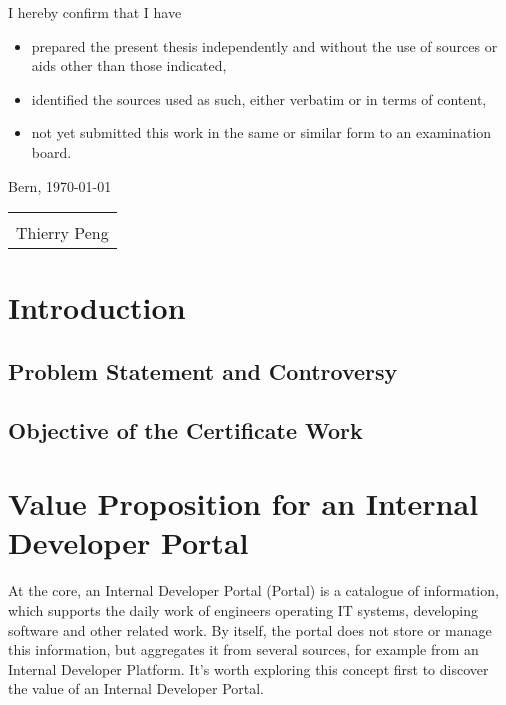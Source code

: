 \documentclass[a4paper,12pt]{article}
\begin{document}
    I hereby confirm that I have
    \begin{itemize}
        \item prepared the present thesis independently and without the use of sources or aids other than those indicated,
        \item identified the sources used as such, either verbatim or in terms of content,
        \item not yet submitted this work in the same or similar form to an examination board.
    \end{itemize}
    Bern, \today\newline
    \newline
    \newline
    \newline
    \begin{tabular}{@{}p{5.0cm}@{}}
        \hrulefill \\
        Thierry Peng
    \end{tabular}

    \pagebreak


    \section{Introduction}

    \subsection{Problem Statement and Controversy}

    \subsection{Objective of the Certificate Work}


    \section{Value Proposition for an Internal Developer Portal}
    At the core, an Internal Developer Portal (Portal) is a catalogue of information, which supports the daily work of
    engineers operating IT systems, developing software and other related work.
    By itself, the portal does not store or manage this information, but aggregates it from several sources, for example
    from an Internal Developer Platform.
    It's worth exploring this concept first to discover the value of an Internal Developer Portal.
\end{document}
